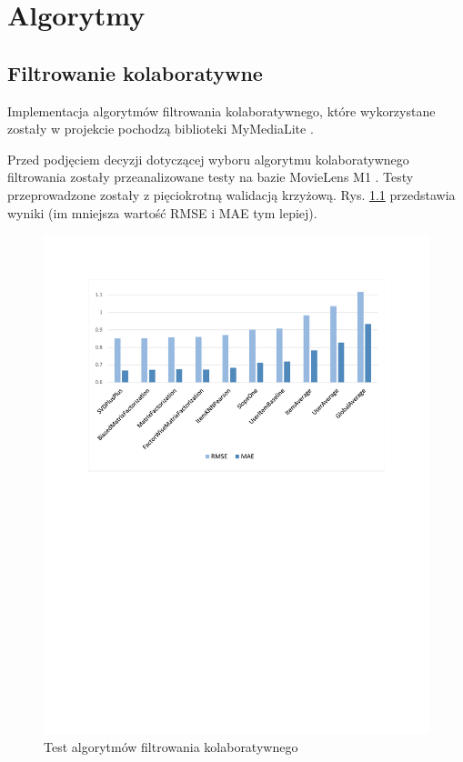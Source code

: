 \documentclass[twoside]{iisthesis}
\begin{document}
 \chapter{Algorytmy}


	 \section{Filtrowanie kolaboratywne}
	 
		 Implementacja algorytmów filtrowania kolaboratywnego, które wykorzystane zostały w projekcie pochodzą biblioteki MyMediaLite \cite{mymedialite,gantner2011mymedialite}. 
	 
		 Przed podjęciem decyzji dotyczącej wyboru algorytmu kolaboratywnego filtrowania zostały przeanalizowane testy na bazie MovieLens M1 \cite{harper2016movielens}. Testy przeprowadzone zostały z pięciokrotną walidacją krzyżową. Rys. \ref{fig:cfcomparision} przedstawia wyniki (im mniejsza wartość RMSE i MAE tym lepiej). 
	 
		 \begin{figure}[!ht] 
		 	\centering
		 	\includegraphics[width=1\textwidth]{cfcomparision}
		 	\caption{Test algorytmów filtrowania kolaboratywnego \protect\cite{mymedialitedatasets}}
		 	\label{fig:cfcomparision}
		 \end{figure}
	 
\end{document}
